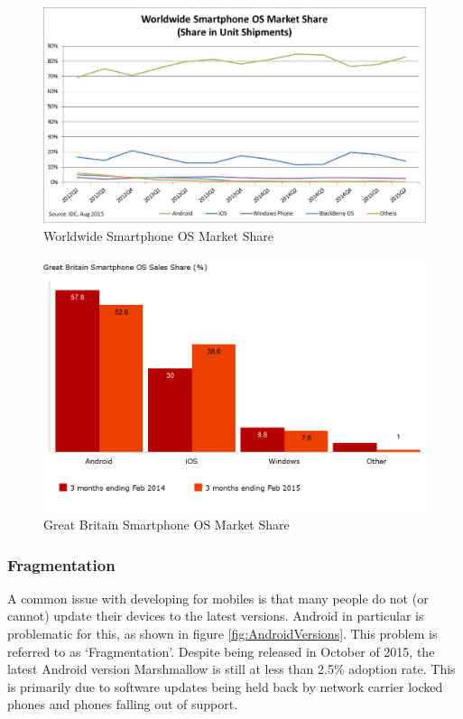 \begin{figure}[ht]
	\centering
	\includegraphics[scale=0.65]{images/phoneMarketShare.png}
	\caption{Worldwide Smartphone OS Market Share \citep{idcsmartphonereport}}
	\label{fig:PhoneMarketShare}
\end{figure}

\begin{figure}[ht]
	\centering
	\includegraphics[scale=0.25]{images/UKSmartphoneSales.png}
	\caption{Great Britain Smartphone OS Market Share \citep{kantargbsmartphonereport}}
	\label{fig:UKPhoneMarketShare}
\end{figure}

\subsubsection{Fragmentation}
A common issue with developing for mobiles is that many people do not (or cannot) update their devices to the latest versions.
Android in particular is problematic for this, as shown in figure \ref{fig:AndroidVersions}.
This problem is referred to as `Fragmentation'.
Despite being released in October of 2015, the latest Android version Marshmallow is still at less than 2.5\% adoption rate. 
This is primarily due to software updates being held back by network carrier locked phones and phones falling out of support.

